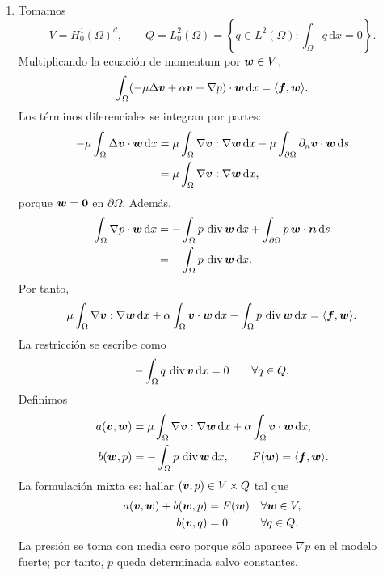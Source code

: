 \documentclass[11pt]{article}
\def\vec   #1{\mbox{\boldmath $#1$}{}}
\def\dx{\mbox{\(\,\mathrm{d}x\)}}
\def\ds{\mbox{\(\,\mathrm{d}s\)}}
\DeclareMathOperator{\dive}{div}
\begin{document}
\begin{enumerate}[label=\textbf{\arabic*.}, leftmargin=*]
\begin{enumerate}[label=(\alph*)]
        \item Tomamos
        \[
            V=H^1_0(\Omega)^d,
            \qquad
            Q=L^2_0(\Omega)=\left\{q\in L^2(\Omega):\int_\Omega q\dx=0\right\}.
        \]
        Multiplicando la ecuación de momentum por $\vec w\in V$,
        \[
            \int_\Omega
            (-\mu\Delta\vec v+\alpha\vec v+\nabla p)\cdot\vec w\dx
            =
            \langle\vec f,\vec w\rangle.
        \]
        Los términos diferenciales se integran por partes:
        \[
        \begin{aligned}
            -\mu\int_\Omega \Delta\vec v\cdot\vec w\dx
            &=
            \mu\int_\Omega \nabla\vec v:\nabla\vec w\dx
            -\mu\int_{\partial\Omega}\partial_n\vec v\cdot\vec w\ds\\
            &=
            \mu\int_\Omega \nabla\vec v:\nabla\vec w\dx,
        \end{aligned}
        \]
        porque $\vec w=\vec0$ en $\partial\Omega$. Además,
        \[
        \begin{aligned}
            \int_\Omega \nabla p\cdot\vec w\dx
            &=
            -\int_\Omega p\,\dive\vec w\dx
            +\int_{\partial\Omega}p\,\vec w\cdot\vec n\ds\\
            &=
            -\int_\Omega p\,\dive\vec w\dx.
        \end{aligned}
        \]
        Por tanto,
        \[
            \mu\int_\Omega \nabla\vec v:\nabla\vec w\dx
            +\alpha\int_\Omega \vec v\cdot\vec w\dx
            -\int_\Omega p\,\dive\vec w\dx
            =
            \langle \vec f,\vec w\rangle.
        \]
        La restricción se escribe como
        \[
            -\int_\Omega q\,\dive\vec v\dx=0
            \qquad\forall q\in Q.
        \]
        Definimos
        \[
        \begin{aligned}
            a(\vec v,\vec w)&=
            \mu\int_\Omega \nabla\vec v:\nabla\vec w\dx
            +\alpha\int_\Omega \vec v\cdot\vec w\dx,\\
            b(\vec w,p)&=-\int_\Omega p\,\dive\vec w\dx,
            \qquad
            F(\vec w)=\langle\vec f,\vec w\rangle.
        \end{aligned}
        \]
        La formulación mixta es: hallar $(\vec v,p)\in V\times Q$ tal que
        \[
        \begin{aligned}
            a(\vec v,\vec w)+b(\vec w,p)&=F(\vec w) &&\forall \vec w\in V,\\
            b(\vec v,q)&=0 &&\forall q\in Q.
        \end{aligned}
        \]
        La presión se toma con media cero porque sólo aparece $\nabla p$ en el modelo fuerte; por tanto, $p$ queda determinada salvo constantes.


\end{enumerate}
\end{enumerate}
\end{document}
